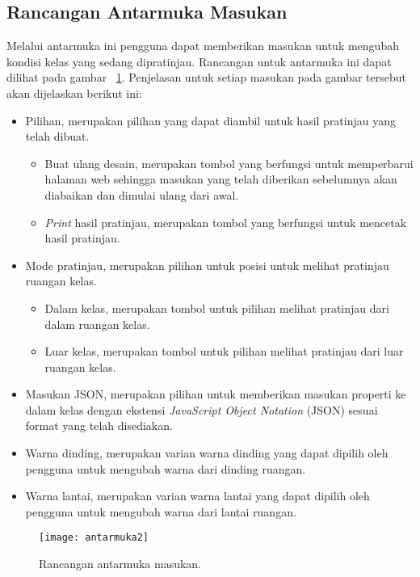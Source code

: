 \subsection{Rancangan Antarmuka Masukan}
\label{sec:antarmukamasukan}
Melalui antarmuka ini pengguna dapat memberikan masukan untuk mengubah kondisi kelas yang sedang dipratinjau. Rancangan untuk antarmuka ini dapat dilihat pada gambar ~\ref{fig:antarmuka2}. Penjelasan untuk setiap masukan pada gambar tersebut akan dijelaskan berikut ini:
\begin{itemize}
	\item Pilihan, merupakan pilihan yang dapat diambil untuk hasil pratinjau yang telah dibuat.
		\begin{itemize}
			\item Buat ulang desain, merupakan tombol yang berfungsi untuk memperbarui halaman web sehingga masukan yang telah diberikan sebelumnya akan diabaikan dan dimulai ulang dari awal.
			\item {\it Print} hasil pratinjau, merupakan tombol yang berfungsi untuk mencetak hasil pratinjau.
		\end{itemize}
	\item Mode pratinjau, merupakan pilihan untuk posisi untuk melihat pratinjau ruangan kelas.
		\begin{itemize}
			\item Dalam kelas, merupakan tombol untuk pilihan melihat pratinjau dari dalam ruangan kelas.
			\item Luar kelas, merupakan tombol untuk pilihan melihat pratinjau dari luar ruangan kelas.
		\end{itemize}
	\item Masukan JSON, merupakan pilihan untuk memberikan masukan properti ke dalam kelas dengan ekstensi {\it JavaScript Object Notation} (JSON) sesuai format yang telah disediakan.
	\item Warna dinding, merupakan varian warna dinding yang dapat dipilih oleh pengguna untuk mengubah warna dari dinding ruangan.
	\item Warna lantai, merupakan varian warna lantai yang dapat dipilih oleh pengguna untuk mengubah warna dari lantai ruangan.
\end{itemize}
\begin{figure}[ht]
	\centering
	\texttt{[image: antarmuka2]}
	\caption{Rancangan antarmuka masukan.}
	\label{fig:antarmuka2}
	\vspace{8mm}
\end{figure}

